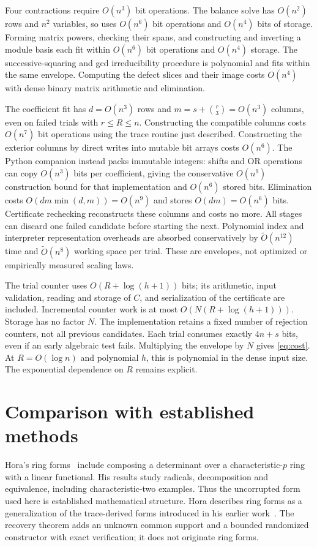 \documentclass[11pt]{article}
\begin{document}
Four contractions require $O(n^3)$ bit operations. The balance solve has
$O(n^2)$ rows and $n^2$ variables, so uses $O(n^6)$ bit operations and
$O(n^4)$ bits of storage. Forming matrix powers, checking their spans, and
constructing and inverting a module basis each fit within $O(n^6)$ bit
operations and $O(n^4)$ storage. The successive-squaring and gcd
irreducibility procedure is polynomial and fits within the same envelope.
Computing the defect slices and their image costs $O(n^4)$ with dense
binary matrix arithmetic and elimination.

The coefficient fit has $d=O(n^3)$ rows and
$m=s+\binom r3=O(n^3)$ columns, even on failed trials with $r\leq R\leq n$.
Constructing the compatible columns costs $O(n^7)$ bit operations using
the trace routine just described. Constructing the exterior columns by direct
writes into mutable bit arrays costs $O(n^6)$. The Python companion instead
packs immutable integers: shifts and OR operations can copy $O(n^3)$ bits
per coefficient, giving the conservative $O(n^9)$ construction bound for
that implementation and $O(n^6)$ stored bits. Elimination costs
$O(dm\min(d,m))=O(n^9)$ and stores
$O(dm)=O(n^6)$ bits. Certificate rechecking reconstructs these columns
and costs no more. All stages can discard one failed candidate before
starting the next. Polynomial index and interpreter representation overheads
are absorbed conservatively by $\widetilde O(n^{12})$ time and
$\widetilde O(n^8)$ working space per trial. These are envelopes, not optimized
or empirically measured scaling laws.

The trial counter uses $O(R+\log(h+1))$ bits; its arithmetic, input validation,
reading and storage of $C$, and serialization of the certificate are included.
Incremental counter work is at most $O(N(R+\log(h+1)))$. Storage has no
factor $N$. The implementation retains a fixed number of rejection counters,
not all previous candidates. Each trial consumes exactly $4n+s$ bits, even
if an early algebraic test fails. Multiplying the envelope by $N$ gives
\eqref{eq:cost}. At $R=O(\log n)$ and polynomial $h$, this is polynomial
in the dense input size. The exponential dependence on $R$ remains explicit.

\section{Comparison with established methods}\label{sec:prior}
Hora's ring forms~\cite{hora} include composing a determinant over a
characteristic-$p$ ring with a linear functional. His results study radicals,
decomposition and equivalence, including characteristic-two examples. Thus
the uncorrupted form used here is established mathematical structure. Hora
describes ring forms as a generalization of the trace-derived forms introduced
in his earlier work~\cite{hora2012}. The
recovery theorem adds an unknown common support and a bounded randomized
constructor with exact verification; it does not originate ring forms.
\end{document}

